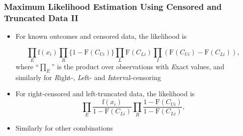 \documentclass{beamer}
\begin{document}
\begin{frame}[shrink=2]
\frametitle{Maximum Likelihood Estimation Using Censored and
Truncated Data II}
\begin{itemize}
\item For known outcomes and censored data, the likelihood is \vspace{2mm}

\begin{equation*}
\prod_{E} \mathrm{f}(x_i) \prod_{R} \{1-\mathrm{F}(C_{Ui})\}
\prod_{L} \mathrm{F}(C_{Li}) \prod_{I}
(\mathrm{F}(C_{Ui})-\mathrm{F}(C_{Li})),
\end{equation*}
where ``$\prod_{E}$'' is the product over observations with
\textit{E}xact values, and similarly for \textit{R}ight-,
\textit{L}eft- and \textit{I}nterval-censoring \vspace{2mm}

\item For right-censored and left-truncated data, the likelihood is
\begin{equation*}
\prod_{E} \frac{\mathrm{f}(x_i)}{1-\mathrm{F}(C_{Li})} \prod_{R}
\frac{1-\mathrm{F}(C_{Ui})}{1-\mathrm{F}(C_{Li})} ,
\end{equation*} \vspace{2mm}

\item Similarly for other combinations
\end{itemize}
\end{frame}
\end{document}
